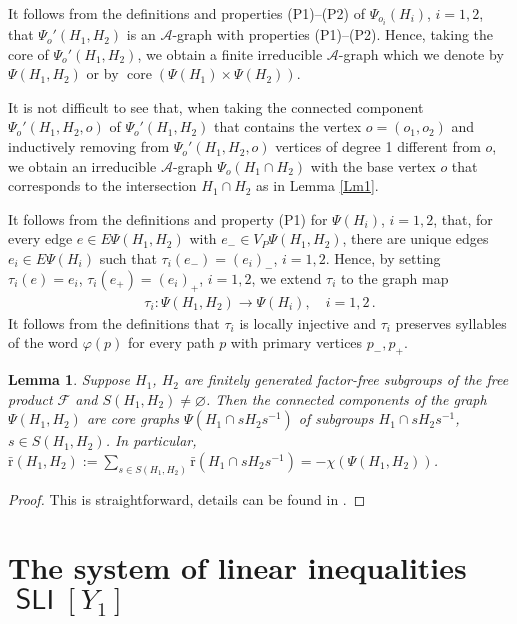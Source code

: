 \documentclass[10pt, reqno]{amsart}
\numberwithin{equation}{section}
\newtheorem{lem}[thm]{Lemma}
\begin{document}
It follows from the definitions and properties (P1)--(P2) of $\Psi_{o_i}(H_i)$, $i=1,2$, that $\Psi_o'(H_1, H_2)$   is an  ${\mathcal{A}}$-graph with properties (P1)--(P2). Hence, taking the core of
$\Psi_o'(H_1, H_2)$, we obtain a  finite  irreducible  ${\mathcal{A}}$-graph which we  denote by $\Psi(H_1, H_2)$ or by $\operatorname{core}(\Psi(H_1) \times \Psi(H_2))$.

It is not difficult to see that, when taking the connected component $\Psi_o'(H_1, H_2, o)$  of $\Psi_o'(H_1, H_2)$  that contains the vertex $o = (o_1, o_2)$ and inductively removing  from $\Psi_o'(H_1, H_2, o)$  vertices of degree 1 different from $o$, we obtain an
irreducible  ${\mathcal{A}}$-graph $\Psi_o(H_1\cap H_2)$ with the base vertex $o$ that  corresponds to the intersection $H_1\cap H_2$ as in Lemma \ref{Lm1}.

It follows from the definitions and property (P1) for  $\Psi(H_i)$, $i=1,2$,   that, for every edge $e \in E \Psi(H_1, H_2)$ with $e_- \in V_P \Psi(H_1, H_2)$, there are unique edges
$e_i  \in E\Psi(H_i)$ such that  $\tau_i(e_-) =(e_i)_-$, $i=1,2$. Hence, by setting  $\tau_i(e) =e_i$, $\tau_i(e_+) =(e_i)_+$, $i=1,2$,   we extend  $\tau_i$ to the graph map
\begin{gather}\label{tau1}
\tau_i :  \Psi(H_1, H_2) \to  \Psi(H_i)  , \quad i=1,2 \, .
\end{gather}
It follows from the definitions that $\tau_i$ is locally injective and $\tau_i$ preserves  syllables of the word ${\varphi}(p)$ for every path $p$ with primary vertices $p_-, p_+$.

\begin{lem}\label{Lm3} Suppose $H_1$, $H_2$ are  finitely generated factor-free
subgroups of the free product ${\mathcal{F}}$ and
$S(H_1, H_2) \ne  \varnothing$.  Then the connected components of the graph  $\Psi(H_1, H_2)$ are core graphs  $\Psi(H_1 \cap s H_2 s^{-1})$ of subgroups $H_1 \cap s H_2 s^{-1}$, $s \in S(H_1, H_2)$. In particular,
$\bar {\mathrm{r}}(H_1, H_2) :=
\sum_{s \in S(H_1, H_2) } \bar {\mathrm{r}}(H_1 \cap s  H_2 s^{-1}) =
-\chi(\Psi(H_1, H_2) )$.
\end{lem}
\begin{proof} This is straightforward, details can be found in \cite{Iv12}.
\end{proof}

\section{The system of linear inequalities $\operatorname{\textsf{SLI}}[Y_1]$}
\end{document}
